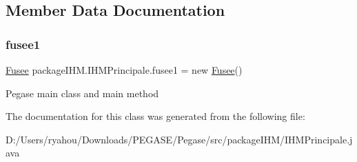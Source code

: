 \subsection{Member Data Documentation}
\mbox{\label{classpackage_i_h_m_1_1_i_h_m_principale_a0259c90c422f8e2265817915fe17ff0b}} 
\subsubsection{\texorpdfstring{fusee1}{fusee1}}
{\footnotesize\ttfamily \mbox{\hyperlink{classpackage_i_h_m_1_1_fusee}{Fusee}} package\+I\+H\+M.\+I\+H\+M\+Principale.\+fusee1 = new \mbox{\hyperlink{classpackage_i_h_m_1_1_fusee}{Fusee}}()\hspace{0.3cm}{\ttfamily [static]}}

Pegase main class and main method 

The documentation for this class was generated from the following file\+:\begin{DoxyCompactItemize}
\item 
D\+:/\+Users/ryahou/\+Downloads/\+P\+E\+G\+A\+S\+E/\+Pegase/src/package\+I\+H\+M/I\+H\+M\+Principale.\+java\end{DoxyCompactItemize}
